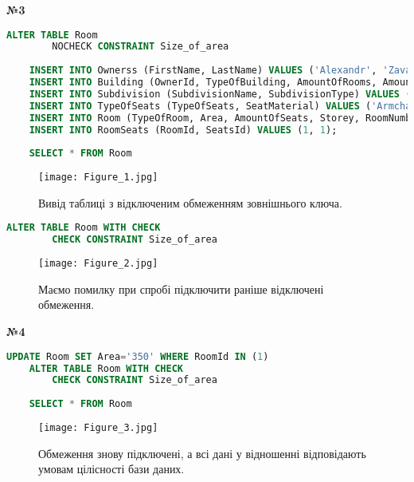 \documentclass[a4paper,12pt]{article}
\begin{document}
	\begin{center}
		\textbf{№3}
	\end{center}
	\begin{lstlisting}[language=SQL]
	ALTER TABLE Room
		NOCHECK CONSTRAINT Size_of_area
	
	INSERT INTO Ownerss (FirstName, LastName) VALUES ('Alexandr', 'Zavalii');
	INSERT INTO Building (OwnerId, TypeOfBuilding, AmountOfRooms, AmountOfFloors) VALUES (1, 'Enterprise', 30, 3);
	INSERT INTO Subdivision (SubdivisionName, SubdivisionType) VALUES ('Lab', 'Chemical');
	INSERT INTO TypeOfSeats (TypeOfSeats, SeatMaterial) VALUES ('Armchairs','Leather');
	INSERT INTO Room (TypeOfRoom, Area, AmountOfSeats, Storey, RoomNumber, SeatsId, SubdivisionId, BiuldingId) VALUES ('The audience', 9999, 40, 1, 23, 1, 1, 1);
	INSERT INTO RoomSeats (RoomId, SeatsId) VALUES (1, 1);
	
	SELECT * FROM Room
	\end{lstlisting}
	\begin{figure}[h!]
		\centering
		\begin{minipage}[h]{1\linewidth}
			\texttt{[image: Figure\_1.jpg]}  
		\end{minipage}
		\caption{Вивід таблиці з відключеним обмеженням зовнішнього ключа.}
	\end{figure}
\newpage
	\begin{lstlisting}[language=SQL]
	ALTER TABLE Room WITH CHECK
		CHECK CONSTRAINT Size_of_area
	\end{lstlisting}
	\begin{figure}[h!]
		\centering
		\begin{minipage}[h]{1.05\linewidth}
			\texttt{[image: Figure\_2.jpg]}  
		\end{minipage}
		\caption{Маємо помилку при спробі підключити раніше відключені обмеження.}
	\end{figure}
	\begin{center}
		\textbf{№4}
	\end{center}
	\begin{lstlisting}[language=SQL]
	UPDATE Room SET Area='350' WHERE RoomId IN (1)
	ALTER TABLE Room WITH CHECK
		CHECK CONSTRAINT Size_of_area
		
	SELECT * FROM Room
	\end{lstlisting}
	\begin{figure}[h!]
		\centering
		\begin{minipage}[h]{1.05\linewidth}
			\texttt{[image: Figure\_3.jpg]}  
		\end{minipage}
		\caption{Обмеження знову підключені, а всі дані у відношенні відповідають умовам цілісності бази даних.}
	\end{figure}
\end{document}

